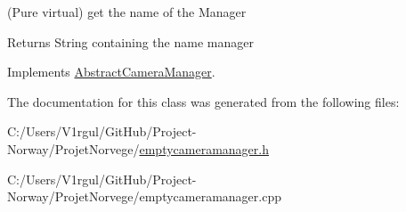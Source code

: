 (Pure virtual) get the name of the Manager 

\begin{DoxyReturn}{Returns}
String containing the name manager 
\end{DoxyReturn}


Implements \hyperlink{class_abstract_camera_manager_a6e4b041842471b9ed42ddd5c9ab260d1}{Abstract\-Camera\-Manager}.



The documentation for this class was generated from the following files\-:\begin{DoxyCompactItemize}
\item 
C\-:/\-Users/\-V1rgul/\-Git\-Hub/\-Project-\/\-Norway/\-Projet\-Norvege/\hyperlink{emptycameramanager_8h}{emptycameramanager.\-h}\item 
C\-:/\-Users/\-V1rgul/\-Git\-Hub/\-Project-\/\-Norway/\-Projet\-Norvege/emptycameramanager.\-cpp\end{DoxyCompactItemize}
